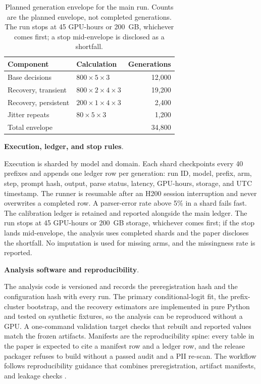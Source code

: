\documentclass[a4paper,fleqn]{cas-sc}
\begin{document}
\begin{table}[pos=htbp]
  \centering
  \caption{Planned generation envelope for the main run. Counts are the planned envelope, not
  completed generations. The run stops at 45 GPU-hours or 200~GB, whichever comes first; a stop
  mid-envelope is disclosed as a shortfall.}
  \label{tab:envelope}
  \small
  \begin{tabular}{>{\raggedright\arraybackslash}p{5.2cm}>{\raggedright\arraybackslash}p{6.4cm}r}
    \toprule
    \textbf{Component} & \textbf{Calculation} & \textbf{Generations} \\
    \midrule
    Base decisions            & $800 \times 5 \times 3$                       & 12{,}000 \\
    Recovery, transient       & $800 \times 2 \times 4 \times 3$              & 19{,}200 \\
    Recovery, persistent      & $200 \times 1 \times 4 \times 3$              & 2{,}400 \\
    Jitter repeats            & $80 \times 5 \times 3$                        & 1{,}200 \\
    \midrule
    Total envelope            &                                               & 34{,}800 \\
    \bottomrule
  \end{tabular}
\end{table}

\noindent\textbf{Execution, ledger, and stop rules}.\

Execution is sharded by model and domain. Each shard checkpoints every 40 prefixes and appends
one ledger row per generation: run ID, model, prefix, arm, step, prompt hash, output, parse
status, latency, GPU-hours, storage, and UTC timestamp. The runner is resumable after an H200
session interruption and never overwrites a completed row. A parser-error rate above 5\% in a
shard fails fast. The calibration ledger is retained and reported alongside the main ledger. The
run stops at 45 GPU-hours or 200~GB storage, whichever comes first; if the stop lands
mid-envelope, the analysis uses completed shards and the paper discloses the shortfall. No
imputation is used for missing arms, and the missingness rate is reported.

\noindent\textbf{Analysis software and reproducibility}.\

The analysis code is versioned and records the preregistration hash and the configuration hash
with every run. The primary conditional-logit fit, the prefix-cluster bootstrap, and the
recovery estimators are implemented in pure Python and tested on synthetic fixtures, so the
analysis can be reproduced without a GPU. A one-command validation target checks that rebuilt and
reported values match the frozen artifacts. Manifests are the reproducibility spine: every table
in the paper is expected to cite a manifest row and a ledger row, and the release packager
refuses to build without a passed audit and a PII re-scan. The workflow follows reproducibility
guidance that combines preregistration, artifact manifests, and leakage checks
\cite{nosek2018,munafo2017,pineau,kapoor2023}.
\end{document}
